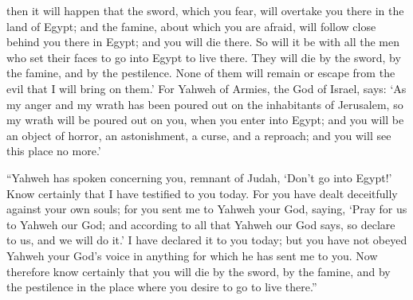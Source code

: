 {then it will happen that the sword, which you fear, will overtake you there in the land of Egypt; and the famine, about which you are afraid, will follow close behind you there in Egypt; and you will die there.
So will it be with all the men who set their faces to go into Egypt to live there. They will die by the sword, by the famine, and by the pestilence. None of them will remain or escape from the evil that I will bring on them.’
For Yahweh of Armies, the God of Israel, says: ‘As my anger and my wrath has been poured out on the inhabitants of Jerusalem, so my wrath will be poured out on you, when you enter into Egypt; and you will be an object of horror, an astonishment, a curse, and a reproach; and you will see this place no more.’
\par }{\PP {}“Yahweh has spoken concerning you, remnant of Judah, ‘Don’t go into Egypt!’ Know certainly that I have testified to you today.
For you have dealt deceitfully against your own souls; for you sent me to Yahweh your God, saying, ‘Pray for us to Yahweh our God; and according to all that Yahweh our God says, so declare to us, and we will do it.’
I have declared it to you today; but you have not obeyed Yahweh your God’s voice in anything for which he has sent me to you.
Now therefore know certainly that you will die by the sword, by the famine, and by the pestilence in the place where you desire to go to live there.”

}
